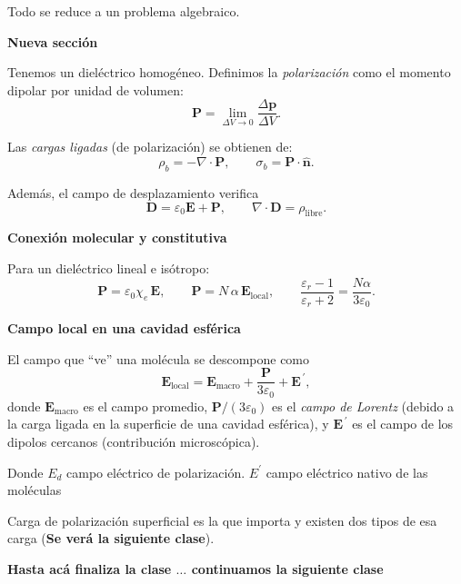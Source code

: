 \documentclass{article}
\begin{document}
Todo se reduce a un problema algebraico. 

\textbf{Nueva sección}

Tenemos un dieléctrico homogéneo. Definimos la \emph{polarización} como el momento dipolar por unidad de volumen:
\[
\mathbf{P}=\lim_{\Delta V\to 0}\frac{\Delta \mathbf{p}}{\Delta V}.
\]

Las \emph{cargas ligadas} (de polarización) se obtienen de:
\[
\rho_b=-\nabla\cdot\mathbf{P},\qquad \sigma_b=\mathbf{P}\cdot\hat{\mathbf n}.
\]

Además, el campo de desplazamiento verifica
\[
\mathbf{D}=\varepsilon_0\mathbf{E}+\mathbf{P},\qquad \nabla\cdot\mathbf{D}=\rho_{\text{libre}}.
\]

\textbf{Conexión molecular y constitutiva}

Para un dieléctrico lineal e isótropo:
\[
\mathbf{P}=\varepsilon_0\chi_e\,\mathbf{E},\qquad 
\mathbf{P}=N\,\alpha\,\mathbf{E}_{\text{local}},\qquad 
\frac{\varepsilon_r-1}{\varepsilon_r+2}=\frac{N\alpha}{3\varepsilon_0}.
\]

\textbf{Campo local en una cavidad esférica}

El campo que “ve” una molécula se descompone como
\[
\mathbf{E}_{\text{local}}=\mathbf{E}_{\text{macro}}+\frac{\mathbf{P}}{3\varepsilon_0}+\mathbf{E}^{\,\prime},
\]
donde $\mathbf{E}_{\text{macro}}$ es el campo promedio, $\mathbf{P}/(3\varepsilon_0)$ es el
\emph{campo de Lorentz} (debido a la carga ligada en la superficie de una cavidad esférica),
y $\mathbf{E}^{\,\prime}$ es el campo de los dipolos cercanos (contribución microscópica).


Donde $E_{d}$ campo eléctrico de polarización. $E^{\prime}$ campo eléctrico nativo de las moléculas	

Carga de polarización superficial es la que importa y existen dos tipos de esa carga (\textbf{Se verá la siguiente clase}).



\textbf{Hasta acá finaliza la clase $\ldots$ continuamos la siguiente clase}




\end{document}
